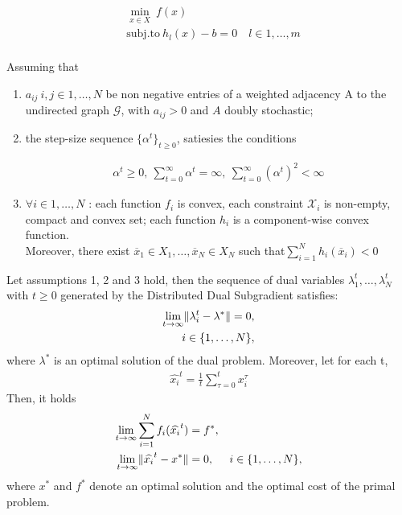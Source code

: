 \documentclass{article}
\DeclarePairedDelimiter{\norm}{\lVert}{\rVert}
\begin{document}
  \begin{align}
  & \min_{x \in X} \ f(x) \\
  &\text{subj.to}  \ h_l(x)-b=0 \quad l\in {1,\dots, m}  \\
\end{align}
  
\noindent Assuming that

\begin{enumerate}

\item ${a_{ij}\ i,j\in{1,\dots, N}}$ be non negative entries of a weighted adjacency A to the undirected graph ${\mathcal{G}}$, with ${a_{ij}>0}$ and ${A}$ doubly stochastic;
\item the step-size sequence ${\{\alpha^{t}\}_{t\geq 0}}$, satiesies the conditions

\begin{align}
    \alpha^{t}\geq0,\ \sum_{t=0}^{\infty} \alpha^{t}=\infty,\ \sum_{t=0}^{\infty} (\alpha^{t})^2<\infty
\end{align}

\item ${\forall i \in {1,\dots, N}}$  : each function ${f_i}$ is convex, each constraint ${\mathcal{X}_i}$ is non-empty, compact and convex set; each function ${h_i}$ is a component-wise convex function. \\Moreover, there exist ${\overline{x}_1\in X_1,\dots,\overline{x}_N\in X_N}$ such that${\sum_{i=1}^{N} h_i(\overline{x}_i)<0}$ 
\end{enumerate}

\noindent Let assumptions 1, 2 and 3  hold, then the sequence of dual variables ${\lambda_1^t,\dots,\lambda_N^t}$ with ${t\geq0}$ generated by the Distributed Dual Subgradient satisfies:
\begin{align}
    \lim_{t \to \infty}\norm{\lambda_i^t-\lambda^*}=0, \\ i\in\{1,\dots, N\},
\end{align}
where ${\lambda^*}$ is an optimal solution of the dual problem. Moreover, let for each t,
\begin{align}
    \widehat{x_i}^t= \frac{1}{t} \sum_{\tau=0}^{t} x_i^\tau
\end{align}
Then, it holds
\begin{align}
    \lim_{t \to \infty} \sum_{i=1}^{N} f_i(\widehat{x_i}^t) &= f^*,\\
    \lim_{t \to \infty}\norm{\widehat{x_i}^t-x^*}&=0, & i\in\{1,\dots,N\},
\end{align}
where ${x^*}$ and ${f^*}$ denote an optimal solution and the optimal cost of the primal problem. 
\end{document}
